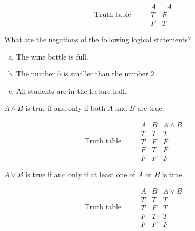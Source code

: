    \begin{equation}
   \mbox{ Truth table }\qquad 
    \begin{array}{c|c}
     A & \neg A\\ \hline
     T & F\\
     F & T
    \end{array}
   \end{equation}

\begin{example}
What are the negations of the following logical statements?
 	\begin{enumerate}[(a)]
 		\item The wine bottle is full.
 		 \white{2cm}{}
 		\item The number $5$ is smaller than the number $2$.
 		\white{2cm}{}
 		\item All students are in the lecture hall.
 		\white{2cm}{}
 	\end{enumerate}
\end{example}

\begin{definition}
 $A \wedge B$ is true if and only if both $A$  and $B$ are true.
\end{definition}
 
  
   \begin{equation}
   \mbox{ Truth table }\qquad 
    \begin{array}{cc|c}
     A & B & A \wedge B\\ \hline
     T & T& T\\
     T & F & F\\
     F & T & F\\
     F & F & F
    \end{array}
   \end{equation}

\begin{definition}
   $A \vee B$ is true if and only if at least one of  $A$ or $B$ is true.
\end{definition}
 
\begin{equation}
\mbox{ Truth table }\qquad 
 \begin{array}{cc|c}
  A & B & A \vee B \\ \hline
  T & T& T\\
  T & F & T\\
  F & T & T\\
  F & F & F
 \end{array}
\end{equation}
